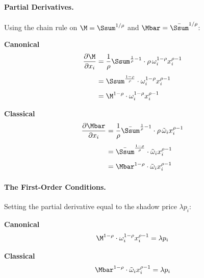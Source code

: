 \paragraph{Partial Derivatives.}
Using the chain rule on $\M = \Ssum^{1/\rho}$ and $\Mbar = \bar{\Ssum}^{1/\rho}$:

\medskip
\noindent
\begin{minipage}[t]{0.48\textwidth}
\centering\textbf{Canonical}
\begin{align}
\frac{\partial \M}{\partial x_i} &= \frac{1}{\rho} \Ssum^{\frac{1}{\rho}-1} \cdot \rho \, \omega_i^{1-\rho} x_i^{\rho-1} \notag \\[4pt]
&= \Ssum^{\frac{1-\rho}{\rho}} \cdot \omega_i^{1-\rho} x_i^{\rho-1} \notag \\[4pt]
&= \M^{1-\rho} \cdot \omega_i^{1-\rho} x_i^{\rho-1}
\label{eq:partial-canonical}
\end{align}
\end{minipage}%
\hfill
\begin{minipage}[t]{0.48\textwidth}
\centering\textbf{Classical}
\begin{align}
\frac{\partial \Mbar}{\partial x_i} &= \frac{1}{\rho} \bar{\Ssum}^{\frac{1}{\rho}-1} \cdot \rho \, \tilde{\omega}_i x_i^{\rho-1} \notag \\[4pt]
&= \bar{\Ssum}^{\frac{1-\rho}{\rho}} \cdot \tilde{\omega}_i x_i^{\rho-1} \notag \\[4pt]
&= \Mbar^{1-\rho} \cdot \tilde{\omega}_i x_i^{\rho-1}
\label{eq:partial-classical}
\end{align}
\end{minipage}

\paragraph{The First-Order Conditions.}
Setting the partial derivative equal to the shadow price $\lambda p_i$:

\medskip
\noindent
\begin{minipage}[t]{0.48\textwidth}
\centering\textbf{Canonical}
\begin{equation}
\M^{1-\rho} \cdot \omega_i^{1-\rho} x_i^{\rho-1} = \lambda p_i
\label{eq:foc-canonical}
\end{equation}
\end{minipage}%
\hfill
\begin{minipage}[t]{0.48\textwidth}
\centering\textbf{Classical}
\begin{equation}
\Mbar^{1-\rho} \cdot \tilde{\omega}_i x_i^{\rho-1} = \lambda p_i
\label{eq:foc-classical}
\end{equation}
\end{minipage}

